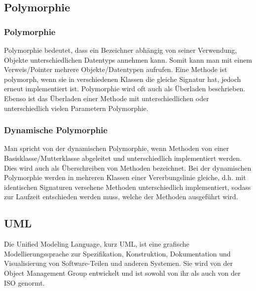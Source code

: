 \documentclass[12pt,a4paper]{article}
\begin{document}
\subsection{Polymorphie}
\subsubsection{Polymorphie}
    Polymorphie bedeutet, dass ein Bezeichner abhängig von seiner Verwendung, Objekte unterschiedlichen Datentyps annehmen kann. Somit kann man mit einem Verweis/Pointer mehrere Objekte/Datentypen aufrufen.
    Eine Methode ist polymorph, wenn sie in verschiedenen Klassen die gleiche Signatur hat, jedoch erneut implementiert ist.
    Polymorphie wird oft auch als Überladen beschrieben. Ebenso ist das Überladen einer Methode mit unterschiedlichen oder unterschiedlich vielen Parametern Polymorphie.

\subsubsection{Dynamische Polymorphie}
    Man spricht von der dynamischen Polymorphie, wenn Methoden von einer Basisklasse/Mutterklasse abgeleitet und unterschiedlich implementiert werden. Dies wird auch als Überschreiben von Methoden bezeichnet.
    Bei der dynamischen Polymorphie werden in mehreren Klassen einer Vererbungslinie gleiche, d.h. mit identischen Signaturen versehene Methoden unterschiedlich implementiert, sodass zur Laufzeit entschieden werden muss, welche der Methoden ausgeführt wird.

\subsection{UML}
    Die Unified Modeling Language, kurz UML, ist eine grafische Modellierungssprache zur Spezifikation, Konstruktion, Dokumentation und Visualisierung von Software-Teilen und anderen Systemen. Sie wird von der Object Management Group entwickelt und ist sowohl von ihr als auch von der ISO genormt.
\end{document}
